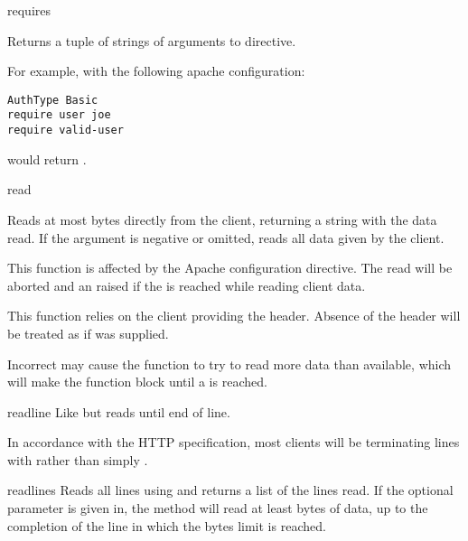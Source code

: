 \begin{methoddesc}[request]{requires}{}

  Returns a tuple of strings of arguments to  directive.
  
  For example, with the following apache configuration:
  \begin{verbatim}
AuthType Basic
require user joe
require valid-user
  \end{verbatim}
   would return .

\end{methoddesc}

\begin{methoddesc}[request]{read}{}

  Reads at most  bytes directly from the client, returning a
  string with the data read. If the  argument is negative or
  omitted, reads all data given by the client.

  This function is affected by the  Apache configuration
  directive. The read will be aborted and an 
  raised if the  is reached while reading client data.

  This function relies on the client providing the 
  header. Absence of the  header will be treated as
  if  was supplied.

  Incorrect  may cause the function to try to read
  more data than available, which will make the function block until a
   is reached.

\end{methoddesc}

\begin{methoddesc}[request]{readline}{}
  Like  but reads until end of line. 
  
  \begin{notice}
    In accordance with the HTTP specification, most clients will
    be terminating lines with  rather
    than simply .
  \end{notice}

\end{methoddesc}

\begin{methoddesc}[request]{readlines}{}
  Reads all lines using  and returns a list of the lines read.
  If the optional  parameter is given in, the method will read
  at least  bytes of data, up to the completion of the line in
  which the  bytes limit is reached.
\end{methoddesc}

